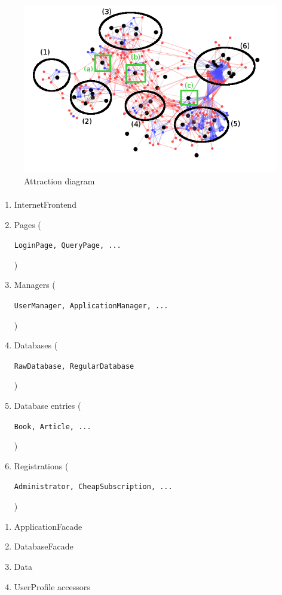 \begin{figure}[H]
    \includegraphics[width=\textwidth]{Attraction_annotated.png}
    \caption{\label{fig:attraction} Attraction diagram}
\end{figure}

\paragraph*{}
\begin{minipage}{0.6\textwidth}
  \begin{enumerate}
    \item InternetFrontend
    \item Pages (\begin{scriptsize}\texttt{LoginPage, QueryPage, ...}\end{scriptsize})
    \item Managers (\begin{scriptsize}\texttt{UserManager, ApplicationManager, ...}\end{scriptsize})
    \item Databases (\begin{scriptsize}\texttt{RawDatabase, RegularDatabase}\end{scriptsize})
    \item Database entries (\begin{scriptsize}\texttt{Book, Article, ...}\end{scriptsize})
    \item Registrations (\begin{scriptsize}\texttt{Administrator, CheapSubscription, ...}\end{scriptsize})
  \end{enumerate}
\end{minipage}\hfill
\begin{minipage}{0.3\textwidth}
  \begin{enumerate}[label=\alph*]
    \item ApplicationFacade
    \item DatabaseFacade
    \item Data
    \item UserProfile accessors
  \end{enumerate}
\end{minipage}

